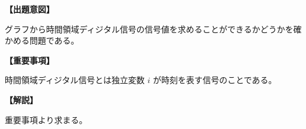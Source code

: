 \noindent \textbf{【出題意図】}

\noindent グラフから時間領域ディジタル信号の信号値を求めることができるかどうかを確かめる問題である。

\vspace{1em}
\noindent \textbf{【重要事項】}

\bigskip
\noindent 時間領域ディジタル信号とは独立変数 $i$ が時刻を表す信号のことである。

\vspace{1em}
\noindent \textbf{【解説】}

\noindent 重要事項より求まる。

